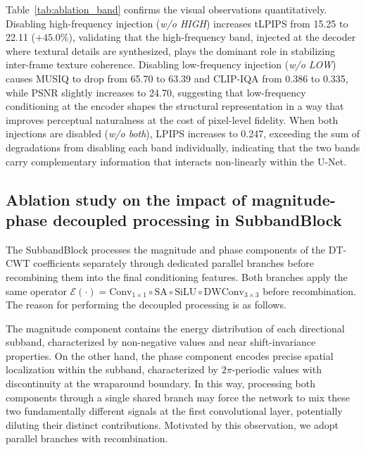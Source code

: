 Table~\ref{tab:ablation_band} confirms the visual observations 
quantitatively. Disabling high-frequency injection 
(\textit{w/o HIGH}) increases tLPIPS from 15.25 to 22.11 
($+45.0\%$), validating that the high-frequency band, injected 
at the decoder where textural details are synthesized, plays 
the dominant role in stabilizing inter-frame texture coherence. 
Disabling low-frequency injection (\textit{w/o LOW}) causes 
MUSIQ to drop from 65.70 to 63.39 and CLIP-IQA from 0.386 to 
0.335, while PSNR slightly increases to 24.70, suggesting that 
low-frequency conditioning at the encoder shapes the 
structural representation in a way that improves perceptual 
naturalness at the cost of pixel-level fidelity. When both 
injections are disabled (\textit{w/o both}), LPIPS increases 
to 0.247, exceeding the sum of degradations from disabling 
each band individually, indicating that the two bands carry 
complementary information that interacts non-linearly within 
the U-Net.


\subsection{Ablation study on the impact of magnitude-phase 
decoupled processing in SubbandBlock}
\label{subsec:ablation_magphase}

The SubbandBlock processes the magnitude and phase components 
of the DT-CWT coefficients separately through dedicated 
parallel branches before recombining them into the final 
conditioning features. Both branches apply the same operator 
$\mathcal{E}(\cdot) = \mathrm{Conv}_{1\times1} \circ 
\mathrm{SA} \circ \mathrm{SiLU} \circ \mathrm{DWConv}_{3\times3}$ 
before recombination. The reason for performing the decoupled 
processing is as follows.

The magnitude component contains the energy distribution of 
each directional subband, characterized by non-negative values 
and near shift-invariance properties. On the other hand, the 
phase component encodes precise spatial localization within 
the subband, characterized by $2\pi$-periodic values with 
discontinuity at the wraparound boundary. In this way, 
processing both components through a single shared branch may 
force the network to mix these two fundamentally different 
signals at the first convolutional layer, potentially diluting 
their distinct contributions. Motivated by this observation, 
we adopt parallel branches with recombination.

